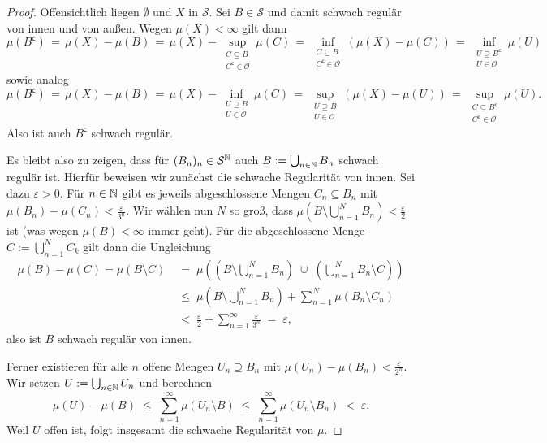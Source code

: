 \documentclass[../main/main.tex]{subfiles}
\begin{document}
	\begin{proof}
		Offensichtlich liegen $\emptyset$ und $X$ in $\mathcal{S}$. Sei $B \in \mathcal{S}$ und damit schwach regulär 
		von innen und von außen. Wegen $\mu(X) < \infty$ gilt dann
		$$\mu(B^\mathsf{c}) 
		\, = \, \mu(X) - \mu(B) 
		\, = \, \mu(X) - \sup_{\substack{C \subseteq B \\ C^\mathsf{c} \in \mathcal{O}}} \mu(C) 
		\, = \, \inf_{\substack{C \subseteq B \\ C^\mathsf{c} \in \mathcal{O}}} (\mu(X) - \mu(C))
		\, = \, \inf_{\substack{U \supseteq B^\mathsf{c} \\ U \in \mathcal{O}}} \mu(U)$$
		sowie analog
		$$\mu(B^\mathsf{c}) 
		\, = \, \mu(X) - \mu(B) 
		\, = \, \mu(X) - \inf_{\substack{U \supseteq B \\ U \in \mathcal{O}}} \mu(C)
		\, = \, \sup_{\substack{U \supseteq B \\ U \in \mathcal{O}}} (\mu(X) - \mu(U))
		\, = \, \sup_{\substack{C \subseteq B^\mathsf{c} \\ C^\mathsf{c} \in \mathcal{O}}} \mu(U) \text{.}$$
		Also ist auch $B^\mathsf{c}$ schwach regulär. 
		
		Es bleibt also zu zeigen, dass für $(B_n)_n \in \mathcal{S}^{\mathbb{N}}$ auch $B \vcentcolon = 
		\bigcup_{n \in \mathbb{N}} B_n$ schwach regulär ist. 
		Hierfür beweisen wir zunächst die schwache Regularität von innen. 
		Sei dazu $\varepsilon > 0$. Für $n \in \mathbb{N}$ gibt es jeweils abgeschlossene Mengen 
		$C_n \subseteq B_n$ mit $\mu(B_n) - \mu(C_n) < \frac{\varepsilon}{3^n}$.
		Wir wählen nun $N$ so groß, dass $\mu\left( B \setminus \bigcup_{n=1}^N B_n \right) 
		< \frac{\varepsilon}{2}$ ist (was wegen $\mu(B) < \infty$ immer geht). Für die abgeschlossene Menge $C := \bigcup_{n=1}^N C_k$ gilt dann die Ungleichung 
		\begin{align*}
			\mu(B) - \mu(C) = \mu(B\setminus C) \; &=
			    \; \mu\left( \left( B \setminus \bigcup_{n=1}^N B_n \right) \; \cup \; 
			    \left( \bigcup_{n=1}^N B_n  \setminus C \right) \right) \\
			&\leq \; \mu \left( B \setminus \bigcup_{n=1}^N B_n \right) + 
			\sum_{n=1}^{N} \mu(B_n \setminus C_n) \\
			&<    \; \frac{\varepsilon}{2} + 
			\sum_{n=1}^{\infty} \frac{\varepsilon}{3^n} \; = \; \varepsilon \text{,}
		\end{align*}
		also ist $B$ schwach regulär von innen.
		
		Ferner existieren für alle $n$ offene Mengen $U_n \supseteq B_n$ mit $\mu(U_n) - \mu(B_n) < \frac{\varepsilon}{2^n}$. Wir setzen 
		$U := \bigcup_{n \in \mathbb{N}} U_n$ und berechnen  
		$$\mu(U) - \mu(B) \; \leq \; \sum_{n=1}^\infty \mu(U_n \setminus B) \; \leq \; 
		\sum_{n=1}^\infty \mu(U_n \setminus B_n) \; < \; \varepsilon \text{.}$$
		Weil $U$ offen ist, folgt insgesamt die schwache Regularität von $\mu$.
	\end{proof}
\end{document}
